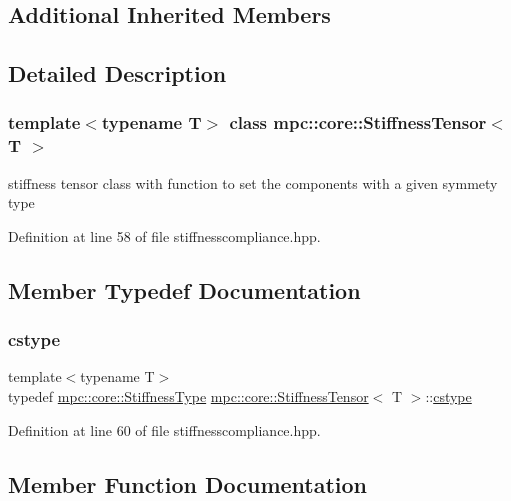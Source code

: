 \subsection*{Additional Inherited Members}


\subsection{Detailed Description}
\subsubsection*{template$<$typename T$>$\newline
class mpc\+::core\+::\+Stiffness\+Tensor$<$ T $>$}

stiffness tensor class with function to set the components with a given symmety type 

Definition at line 58 of file stiffnesscompliance.\+hpp.



\subsection{Member Typedef Documentation}
\mbox{\label{structmpc_1_1core_1_1_stiffness_tensor_ad8129e50fb9d974c0ba792d8b17b203a}} 
\subsubsection{\texorpdfstring{cstype}{cstype}}
{\footnotesize\ttfamily template$<$typename T$>$ \\
typedef \mbox{\hyperlink{structmpc_1_1core_1_1_stiffness_type}{mpc\+::core\+::\+Stiffness\+Type}} \mbox{\hyperlink{structmpc_1_1core_1_1_stiffness_tensor}{mpc\+::core\+::\+Stiffness\+Tensor}}$<$ T $>$\+::\mbox{\hyperlink{structmpc_1_1core_1_1_stiffness_tensor_ad8129e50fb9d974c0ba792d8b17b203a}{cstype}}}



Definition at line 60 of file stiffnesscompliance.\+hpp.



\subsection{Member Function Documentation}
\mbox{\label{structmpc_1_1core_1_1_stiffness_tensor_af86bb5adbcc6bb3df1ed6bfabb8fde91}} 

